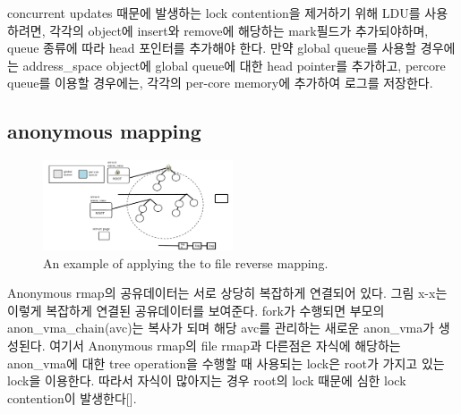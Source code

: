 
concurrent updates 때문에 발생하는 lock contention을 제거하기 위해 LDU를 사용하려면,
각각의 object에 insert와 remove에 해당하는 mark필드가 추가되야하며, queue 종류에 따라 head 포인터를
추가해야 한다. 만약 global queue를 사용할 경우에는 address\_space object에 global queue에 대한
head pointer를 추가하고, percore queue를 이용할 경우에는, 각각의 per-core memory에 추가하여 로그를 
저장한다. 

\subsection{anonymous mapping}

\begin{figure}[tb]
  \begin{center}
     \includegraphics[width=0.5\textwidth,height=0.5\textheight,keepaspectratio]{fig/anon_vma}
  \end{center}
  \caption{An example of applying the  to file reverse mapping. }
  \label{fig:deferu2}
\end{figure}


Anonymous rmap의 공유데이터는 서로 상당히 복잡하게 연결되어 있다. 
그림 x-x는 이렇게 복잡하게 연결된 공유데이터를 보여준다.
fork가 수행되면 부모의 anon\_vma\_chain(avc)는 복사가 되며 해당 avc를 관리하는 새로운 anon\_vma가 생성된다. 
여기서 Anonymous rmap의 file rmap과 다른점은 자식에 해당하는 anon\_vma에 대한 tree operation을
수행할 때 사용되는 lock은 root가 가지고 있는 lock을 이용한다. 
따라서 자식이 많아지는 경우 root의 lock 때문에 심한 lock contention이 발생한다[].


